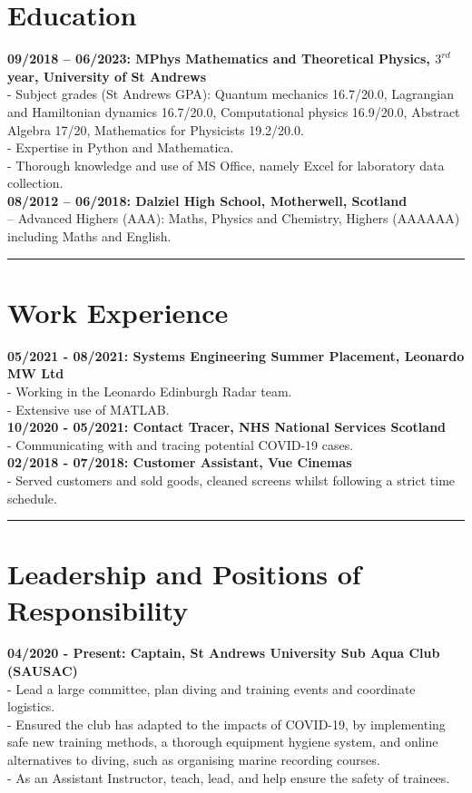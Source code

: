 %
%


%
%
\section*{Education}
\textbf{09/2018 -- 06/2023: MPhys Mathematics and Theoretical Physics, $3^{rd}$ year, University of St Andrews}\\
 - Subject grades (St Andrews GPA): Quantum mechanics 16.7/20.0, Lagrangian and Hamiltonian dynamics 16.7/20.0, Computational physics 16.9/20.0, Abstract Algebra 17/20, Mathematics for Physicists 19.2/20.0.\\
 - Expertise in Python and Mathematica.\\
 - Thorough knowledge and use of MS Office, namely Excel for laboratory data collection.\\

\textbf{08/2012 -- 06/2018: Dalziel High School, Motherwell, Scotland}\\
 -- Advanced Highers (AAA): Maths, Physics and Chemistry, Highers (AAAAAA) including Maths and English.

\noindent\rule[0.5ex]{\linewidth}{1pt}

%
%
\section*{Work Experience}
\textbf{05/2021 - 08/2021: Systems Engineering Summer Placement, Leonardo MW Ltd}\\
 - Working in the Leonardo Edinburgh Radar team.\\
 - Extensive use of MATLAB.\\


\textbf{10/2020 - 05/2021: Contact Tracer, NHS National Services Scotland}\\
 - Communicating with and tracing potential COVID-19 cases.\\

\textbf{02/2018 - 07/2018: Customer Assistant, Vue Cinemas}\\
 - Served customers and sold goods, cleaned screens whilst following a strict time schedule.\\
\noindent\rule[0.5ex]{\linewidth}{1pt}

%
%
\section*{Leadership and Positions of Responsibility}
\textbf{04/2020 - Present: Captain, St Andrews University Sub Aqua Club (SAUSAC)}\\
 - Lead a large committee, plan diving and training events and coordinate logistics.\\
 - Ensured the club has adapted to the impacts of COVID-19, by implementing safe new training methods, a thorough equipment hygiene system, and online alternatives to diving, such as organising marine recording courses.\\
 - As an Assistant Instructor, teach, lead, and help ensure the safety of trainees.\\

